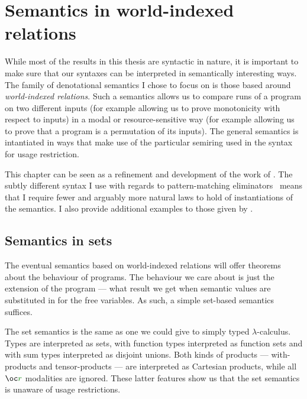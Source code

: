 \chapter{Semantics in world-indexed relations}\label{sec:wrel}

While most of the results in this thesis are syntactic in nature, it is
important to make sure that our syntaxes can be interpreted in semantically
interesting ways.
The family of denotational semantics I chose to focus on is those based around
\emph{world-indexed relations}.
Such a semantics allows us to compare runs of a program on two different inputs
(for example allowing us to prove monotonicity with respect to inputs) in a
modal or resource-sensitive way (for example allowing us to prove that a program
is a permutation of its inputs).
The general semantics is intantiated in ways that make use of the particular
semiring used in the syntax for usage restriction.

This chapter can be seen as a refinement and development of the work of
\citet{AbelBernardy2020}.
The subtly different syntax I use with regards to pattern-matching
eliminators~\citep{HMWO21} means that I require fewer and arguably more natural
laws to hold of instantiations of the semantics.
I also provide additional examples to those given by
\citeauthor{AbelBernardy2020}.

\section{Semantics in sets}\label{sec:set-sem}

The eventual semantics based on world-indexed relations will offer theorems
about the behaviour of programs.
The behaviour we care about is just the extension of the program --- what result
we get when semantic values are substituted in for the free variables.
As such, a simple set-based semantics suffices.

The set semantics is the same as one we could give to simply typed
$\lambda$-calculus.
Types are interpreted as sets, with function types interpreted as function sets
and with sum types interpreted as disjoint unions.
Both kinds of products --- with-products and tensor-products --- are interpreted
as Cartesian products, while all $\oc\gr r$ modalities are ignored.
These latter features show us that the set semantics is unaware of usage
restrictions.


